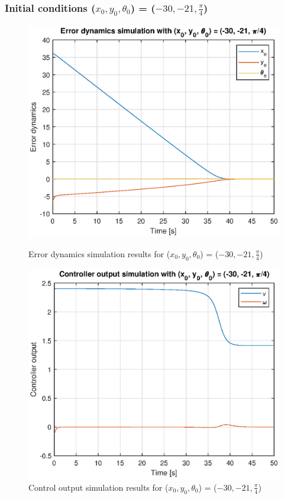 \subsubsection*{Initial conditions ($x_0, y_0, \theta_0$) = ($-30, -21, \frac{\pi}{4}$)}
\begin{figure}[H]
\begin{minipage}{0.5\textwidth}
    \centering
    \includegraphics[width=\textwidth]{Problems/ex6_errora.eps}
    \caption{Error dynamics simulation results for ($x_0, y_0, \theta_0$) = ($-30, -21, \frac{\pi}{4}$)}
    \label{fig:ex6_errora}
\end{minipage}
\begin{minipage}{0.5\textwidth}
    \centering
    \includegraphics[width=\textwidth]{Problems/ex6_controla.eps}
    \caption{Control output simulation results for ($x_0, y_0, \theta_0$) = ($-30, -21, \frac{\pi}{4}$)}
    \label{fig:ex6_controla}
\end{minipage}
\end{figure}

